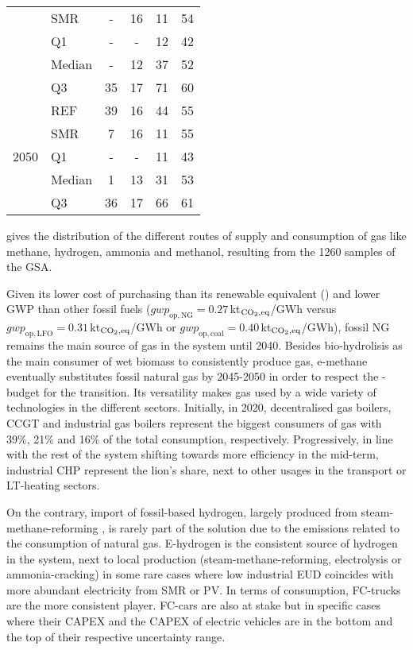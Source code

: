 \begin{table}[htbp!]
\begin{minipage}{\linewidth}
\begin{tabular}{l l | c c c c}
 & SMR & - & 16 & 11 & 54\\
 \cmidrule{2 - 6}
 & Q1 & - & - & 12 & 42\\
 & Median & - & 12 & 37 & 52\\
 & Q3 & 35 & 17 & 71 & 60\\
\toprule
\multirow{5}{*}{2050}
 & REF & 39 & 16 & 44 & 55\\
 & SMR & 7 & 16 & 11 & 55\\
 \cmidrule{2 - 6}
 & Q1 & - & - & 11 & 43\\
 & Median & 1 & 13 & 31 & 53\\
 & Q3 & 36 & 17 & 66 & 61\\
\bottomrule							
\end{tabular}
\end{minipage}
\end{table}

 gives the distribution of the different routes of supply and consumption of gas like methane, hydrogen, ammonia and methanol, resulting from the 1260 samples of the \gls{GSA}.

Given its lower cost of purchasing than its renewable equivalent () and lower \gls{GWP} than other fossil fuels (\ie $\mathit{gwp}_{\mathrm{op,NG}}=0.27$\,kt$_{\ce{CO2},\text{eq}}$/GWh versus $\mathit{gwp}_{\mathrm{op,LFO}}=0.31$\,kt$_{\ce{CO2},\text{eq}}$/GWh or $\mathit{gwp}_{\mathrm{op,coal}}=0.40$\,kt$_{\ce{CO2},\text{eq}}$/GWh), fossil \gls{NG} remains the main source of gas in the system until 2040. Besides bio-hydrolisis as the main consumer of wet biomass to consistently produce gas, e-methane eventually substitutes fossil natural gas by 2045-2050 in order to respect the -budget for the transition. Its versatility makes gas used by a wide variety of technologies in the different sectors. Initially, in 2020, decentralised gas boilers, \gls{CCGT} and industrial gas boilers represent the biggest consumers of gas with 39\%, 21\% and 16\% of the total consumption, respectively. Progressively, in line with the rest of the system shifting towards more efficiency in the mid-term, industrial \gls{CHP} represent the lion's share, next to other usages in the transport or \gls{LT}-heating sectors.

On the contrary, import of fossil-based hydrogen, largely produced from steam-methane-reforming \cite{spf_economie_h2}, is rarely part of the solution due to the emissions related to the consumption of natural gas. E-hydrogen is the consistent source of hydrogen in the system, next to local production (\ie steam-methane-reforming, electrolysis or ammonia-cracking) in some rare cases where low industrial \gls{EUD} coincides with more abundant electricity from \gls{SMR} or \gls{PV}. In terms of consumption, \gls{FC}-trucks are the more consistent player. \gls{FC}-cars are also at stake but in specific cases where their CAPEX and the CAPEX of electric vehicles are in the bottom and the top of their respective uncertainty range.

